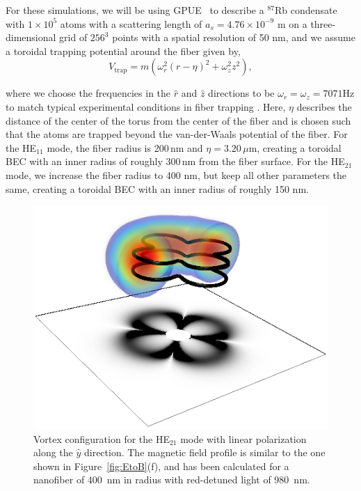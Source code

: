 For these simulations, we will be using GPUE~\cite{schloss2018} to describe a $^{87}$Rb condensate with $1\times10^5$ atoms with a scattering length of $a_s=4.76 \times 10^{-9}$ m on a three-dimensional grid of $256^3$ points with a spatial resolution of 50 nm, and we assume a toroidal trapping potential around the fiber given by,
\begin{equation}
V_\text{trap} = m(\omega_r^2(r-\eta)^2 + \omega_z^2z^2),
\label{eqn:potential}
\end{equation}

\noindent where we choose the frequencies in the $\hat r$ and $\hat z$ directions to be $\omega_r = \omega_z = 7071$Hz to match typical experimental conditions in fiber trapping \cite{vetsch2010}.
Here, $\eta$ describes the distance of the center of the torus from the center of the fiber and is chosen such that the atoms are trapped beyond the van-der-Waals potential of the fiber.
For the HE$_{11}$ mode, the fiber radius is 200\,nm and $\eta = 3.20$\,$\mu$m, creating a toroidal BEC with an inner radius of roughly 300\,nm from the fiber surface.
For the HE$_{21}$ mode, we increase the fiber radius to 400 nm, but keep all other parameters the same, creating a toroidal BEC with an inner radius of roughly 150 nm.

\begin{figure}[tb]
\center \includegraphics[width=0.5\linewidth]{data/3d/HE21_3d.png}
 
 \caption{Vortex configuration for the HE$_{21}$ mode with linear polarization along the $\hat y$ direction.
\label{eqn:potential}
The magnetic field profile is similar to the one shown in Figure~\ref{fig:EtoB}(f), and has been calculated for a nanofiber of 400~nm in radius with red-detuned light of 980~nm.}
 \label{fig:HE21_3d}
\end{figure}

